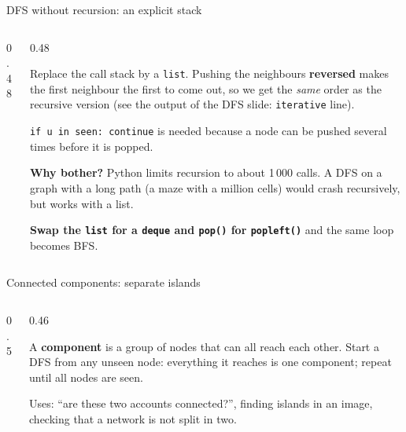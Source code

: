 \documentclass[aspectratio=169,10pt]{beamer}
\begin{document}
\begin{frame}{DFS without recursion: an explicit stack}
\begin{columns}[T]
\begin{column}{0.48\textwidth}
\end{column}
\begin{column}{0.48\textwidth}
{\small
Replace the call stack by a \texttt{list}. Pushing the neighbours \textbf{reversed} makes the first neighbour the first to come out, so we get the \emph{same} order as the recursive version (see the output of the DFS slide: \texttt{iterative} line).

\vspace{2mm}
\texttt{if u in seen: continue} is needed because a node can be pushed several times before it is popped.

\vspace{2mm}
\textbf{Why bother?} Python limits recursion to about 1\,000 calls. A DFS on a graph with a long path (a maze with a million cells) would crash recursively, but works with a list.

\vspace{2mm}
\textbf{Swap the \texttt{list} for a \texttt{deque} and \texttt{pop()} for \texttt{popleft()}} and the same loop becomes BFS.}
\end{column}
\end{columns}
\end{frame}

\begin{frame}{Connected components: separate islands}
\begin{columns}[T]
\begin{column}{0.5\textwidth}
\vspace{2mm}
\end{column}
\begin{column}{0.46\textwidth}
\begin{sfig}[0.4]
\end{sfig}
{\small
A \textbf{component} is a group of nodes that can all reach each other. Start a DFS from any unseen node: everything it reaches is one component; repeat until all nodes are seen.

\vspace{2mm}
Uses: ``are these two accounts connected?'', finding islands in an image, checking that a network is not split in two.}
\end{column}
\end{columns}
\end{frame}
\end{document}

